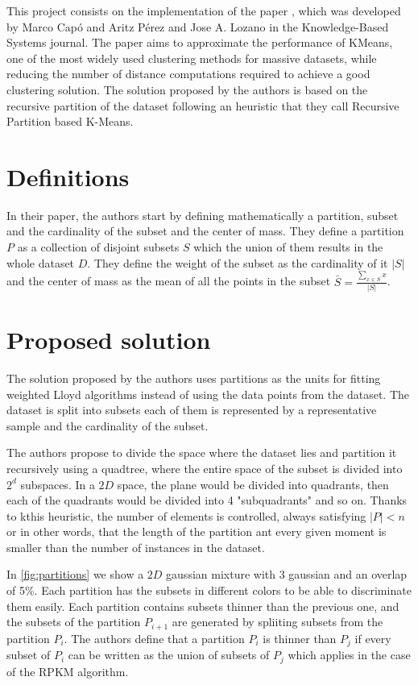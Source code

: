 This project consists on the implementation of the paper \cite{CAPO201756}, which was developed by Marco Capó and Aritz Pérez and Jose A. Lozano in the Knowledge-Based Systems journal. The paper aims to approximate the performance of KMeans, one of the most widely used clustering methods for massive datasets, while reducing the number of distance computations required to achieve a good clustering solution. The solution proposed by the authors is based on the recursive partition of the dataset following an heuristic that they call Recursive Partition based K-Means. 

\section{Definitions}

In their paper, the authors start by defining mathematically a partition, subset and the cardinality of the subset and the center of mass. They define a partition $P$ as a collection of disjoint subsets $S$ which the union of them results in the whole dataset $D$. They define the weight of the subset as the cardinality of it $|S|$ and the center of mass as the mean of all the points in the subset $\bar{S} = \frac{\sum_{x \in S} x }{|S|}$.

\section{Proposed solution}
The solution proposed by the authors uses partitions as the units for fitting weighted Lloyd algorithms instead of using the data points from the dataset. The dataset is split into subsets each of them is represented by a representative sample and the cardinality of the subset.

The authors propose to divide the space where the dataset lies and partition it recursively using a quadtree, where the entire space of the subset is divided into $2^d$ subspaces. In a $2D$ space, the plane would be divided into quadrants, then each of the quadrants would be divided into 4 "subquadrants" and so on. Thanks to kthis heuristic, the number of elements is controlled, always satisfying $|P|<n$ or in other words, that the length of the partition ant every given moment is smaller than the number of instances in the dataset.

In \ref{fig:partitions} we show a $2D$ gaussian mixture with 3 gaussian and an overlap of 5\%. Each partition has the subsets in different colors to be able to discriminate them easily. Each partition contains subsets thinner than the previous one, and the subsets of the partition $P_{i+1}$ are generated by spliiting subsets from the partition $P_i$. The authors define that a partition $P_i$ is thinner than $P_j$ if every subset of $P_i$ can be written as the union of subsets of $P_j$ which applies in the case of the RPKM algorithm.

